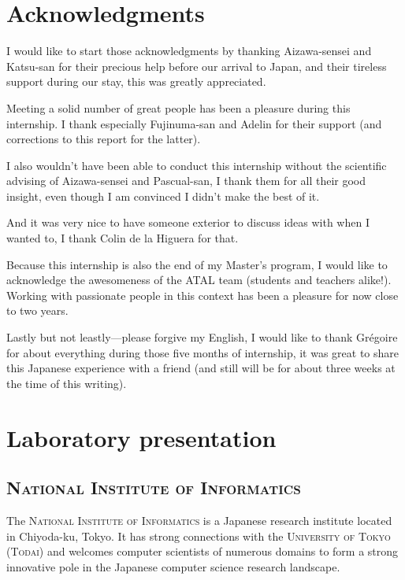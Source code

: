 \documentclass[a4paper, 11pt, onepage]{scrreprt}
\begin{document}
\tableofcontents

\chapter{Acknowledgments}

I would like to start those acknowledgments by thanking Aizawa-sensei
and Katsu-san for their precious help before our arrival to Japan, and
their tireless support during our stay, this was greatly appreciated.

Meeting a solid number of great people has been a pleasure during this
internship. I thank especially Fujinuma-san and Adelin for their
support (and corrections to this report for the latter).

I also wouldn't have been able to conduct this internship without the
scientific advising of Aizawa-sensei and Pascual-san, I thank them for
all their good insight, even though I am convinced I didn't make the
best of it.

And it was very nice to have someone exterior to discuss ideas with
when I wanted to, I thank Colin de la Higuera for that.

Because this internship is also the end of my Master's program, I
would like to acknowledge the awesomeness of the ATAL team (students
and teachers alike!). Working with passionate people in this context
has been a pleasure for now close to two years.

Lastly but not leastly—please forgive my English, I would like to
thank Grégoire for about everything during those five months of
internship, it was great to share this Japanese experience with a
friend (and still will be for about three weeks at the
time of this writing).

\chapter{Laboratory presentation}

\section{\textsc{National Institute of Informatics}}
\label{sec:national-institute-of-informatics}

The \textsc{National Institute of Informatics} is a Japanese research
institute located in Chiyoda-ku, Tokyo. It has strong connections with
the \textsc{University of Tokyo} (\textsc{Todai}) and welcomes
computer scientists of numerous domains to form a strong innovative
pole in the Japanese computer science research landscape.
\end{document}
